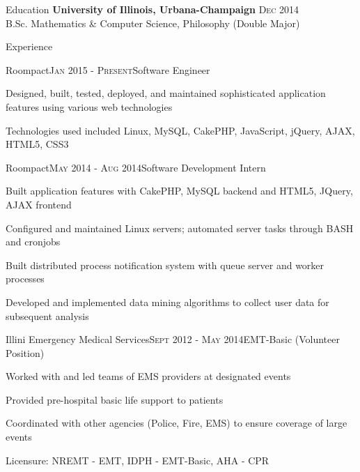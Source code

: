 \documentclass{resume} %
\begin{document}

\begin{rSection}{Education}
{\bf University of Illinois, Urbana-Champaign} \hfill { \textsc{Dec 2014}} \\ 
B.Sc. Mathematics \& Computer Science, Philosophy (Double Major)
\end{rSection}


\begin{rSection}{Experience}
\begin{rSubsection}{Roompact}{\textsc{Jan 2015 - Present}}{Software Engineer}{}
\item Designed, built, tested, deployed, and maintained sophisticated application features using various web technologies
\item Technologies used included Linux, MySQL, CakePHP, JavaScript, jQuery, AJAX, HTML5, CSS3
\end{rSubsection}


\begin{rSubsection}{Roompact}{\textsc{May 2014 - Aug 2014}}{Software Development Intern}{}
\item Built application features with CakePHP, MySQL backend and HTML5, JQuery, AJAX frontend
\item Configured and maintained Linux servers; automated server tasks through BASH and cronjobs
\item Built distributed process notification system with queue server and worker processes
\item Developed and implemented data mining algorithms to collect user data for subsequent analysis
\end{rSubsection}


\begin{rSubsection}{Illini Emergency Medical Services}{\textsc{Sept 2012 - May 2014}}{EMT-Basic (Volunteer Position)}{}
\item Worked with and led teams of EMS providers at designated events
\item Provided pre-hospital basic life support to patients
\item Coordinated with other agencies (Police, Fire, EMS) to ensure coverage of large events
\item Licensure: NREMT - EMT, IDPH - EMT-Basic, AHA - CPR
\end{rSubsection}


\end{rSection}
\end{document}
